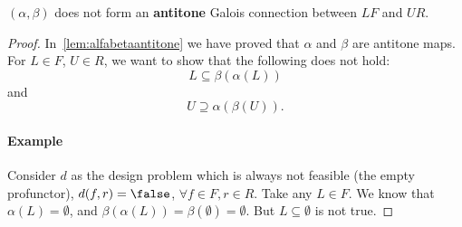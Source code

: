 

\begin{lemma}
  $(\alpha, \beta)$ does not form an \textbf{antitone} Galois connection between $LF$ and $UR$.
\end{lemma}
\begin{proof}
  In~\cref{lem:alfabetaantitone} we have proved that $\alpha$ and $\beta$ are antitone maps. For $L\in F$, $U\in R$, we want to show that the following does not hold:
  \begin{equation}
    \label{eq:alfabetafirst}
    L\subseteq \beta(\alpha(L))
  \end{equation}
  and
  \begin{equation}
    \label{eq:alfabetasec}
    U\supseteq \alpha(\beta(U)).
  \end{equation}

  \paragraph{Example} Consider $d$ as the design problem which is always not feasible (the empty profunctor), \ie  $d(f,r)=\false$, $\forall f\in F,r\in R$. Take any $L\in F$. We know that $\alpha(L)=\emptyset$, and $\beta(\alpha(L))=\beta(\emptyset)=\emptyset$. But $L\subseteq \emptyset$ is not true.

\end{proof}









